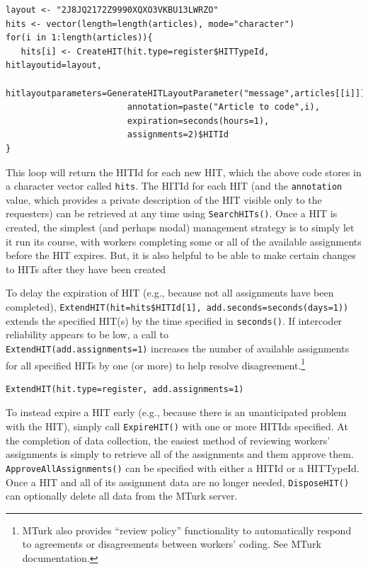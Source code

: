 \documentclass[11pt]{article}
\begin{document}
\begin{Verbatim}[fontsize=\footnotesize, xleftmargin=3mm]
layout <- "2J8JQ2172Z9990XQXO3VKBU13LWRZO"
hits <- vector(length=length(articles), mode="character")
for(i in 1:length(articles)){
   hits[i] <- CreateHIT(hit.type=register$HITTypeId, hitlayoutid=layout,
                        hitlayoutparameters=GenerateHITLayoutParameter("message",articles[[i]]),
                        annotation=paste("Article to code",i),
                        expiration=seconds(hours=1),
                        assignments=2)$HITId
}
\end{Verbatim}

\noindent This loop will return the HITId for each new HIT, which the above code stores in a character vector called \verb|hits|. The HITId for each HIT (and the \verb|annotation| value, which provides a private description of the HIT visible only to the requesters) can be retrieved at any time using \verb|SearchHITs()|. Once a HIT is created, the simplest (and perhaps modal) management strategy is to simply let it run its course, with workers completing some or all of the available assignments before the HIT expires. But, it is also helpful to be able to make certain changes to HITs after they have been created

To delay the expiration of HIT (e.g., because not all assignments have been completed), \verb|ExtendHIT(hit=hits$HITId[1], add.seconds=seconds(days=1))| extends the specified HIT(s) by the time specified in \verb|seconds()|. If intercoder reliability appears to be low, a call to\\ \verb|ExtendHIT(add.assignments=1)| increases the number of available assignments for all specified HITs by one (or more) to help resolve disagreement.\footnote{MTurk also provides ``review policy'' functionality to automatically respond to agreements or disagreements between workers' coding. See MTurk documentation.}

\begin{Verbatim}[fontsize=\footnotesize, xleftmargin=3mm]
ExtendHIT(hit.type=register, add.assignments=1)
\end{Verbatim}

\noindent To instead expire a HIT early (e.g., because there is an unanticipated problem with the HIT), simply call \verb|ExpireHIT()| with one or more HITIds specified. At the completion of data collection, the easiest method of reviewing workers' assignments is simply to retrieve all of the assignments and them approve them. \verb|ApproveAllAssignments()| can be specified with either a HITId or a HITTypeId. Once a HIT and all of its assignment data are no longer needed, \verb|DisposeHIT()| can optionally delete all data from the MTurk server.
\end{document}
